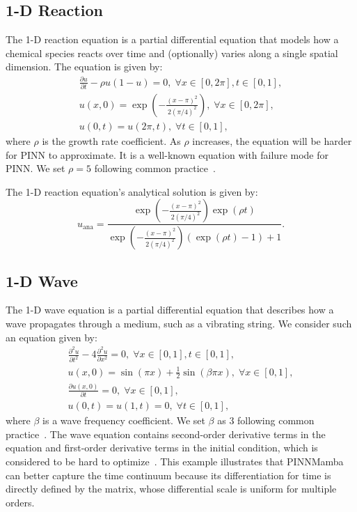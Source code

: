 \documentclass{article}
\theoremstyle{plain}
\theoremstyle{definition}
\theoremstyle{remark}
\begin{document}
\subsection{1-D Reaction}

The 1-D reaction equation is a partial differential equation that models how a chemical species reacts over time and (optionally) varies along a single spatial dimension. The equation is given by:
\begin{gather}
    \frac{\partial u}{\partial t} -\rho u(1-u) = 0,\; \forall x \in[0,2\pi], t\in [0,1],\nonumber\\
    u(x,0) = \exp(-\frac{(x-\pi)^2}{2(\pi/4)^2}),\;\forall x \in[0,2\pi],\\
    u(0,t)=u(2\pi,t),\; \forall  t\in [0,1],\nonumber
\end{gather}
where $\rho$ is the growth rate coefficient. As $\rho$ increases, the equation will be harder for PINN to approximate. It is a well-known equation with failure mode for PINN. We set $\rho=5$ following common practice~\cite{zhao2024pinnsformer,wu2024ropinn}.

The 1-D reaction equation's analytical solution is given by:
\begin{equation}
    u_\text{ana}=\frac{\exp(-\frac{(x-\pi)^2}{2(\pi/4)^2})\exp(\rho t)}{\exp(-\frac{(x-\pi)^2}{2(\pi/4)^2})(\exp(\rho t)-1)+1}.
\end{equation}

\subsection{1-D Wave}

The 1-D wave equation is a partial differential equation that describes how a wave propagates through a medium, such as a vibrating string.  We consider such an equation given by:
\begin{gather}
    \frac{\partial^2 u}{\partial t^2} - 4\frac{\partial^2 u}{\partial x^2} = 0,\; \forall x \in[0,1], t\in [0,1],\nonumber\\
    u(x,0) = \sin(\pi x)+\frac{1}{2}\sin(\beta \pi x), \;\forall x\in[0,1],\\
    \frac{\partial u(x,0)}{\partial t} = 0, \;\forall x\in[0,1],\nonumber\\
    u(0,t)=u(1,t) = 0, \; \forall  t\in [0,1],\nonumber
\end{gather}
where $\beta$ is a wave frequency coefficient. We set $\beta$ as 3 following common practice~\cite{zhao2024pinnsformer,wu2024ropinn}. The wave equation contains second-order derivative terms in the equation and first-order derivative terms in the initial condition, which is considered to be hard to optimize~\cite{wu2024ropinn}. This example illustrates that PINNMamba can better capture the time continuum because its differentiation for time is directly defined by the matrix, whose differential scale is uniform for multiple orders.
\end{document}

